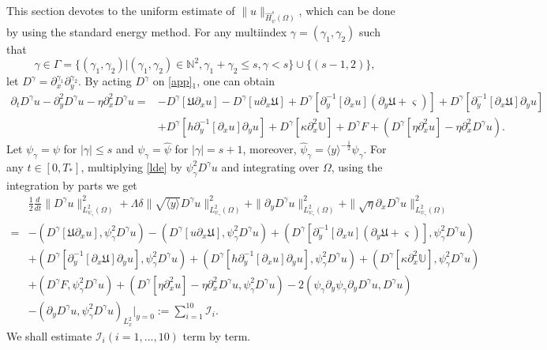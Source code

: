 \documentclass{amsart}
\numberwithin{equation}{section}
\newcommand\y{{{\langle y \rangle}}}
\begin{document}
This section devotes to the uniform estimate of $\|u\|_{\hat{H}_{\psi}^{s}(\Omega)}$, which can be done by using the standard energy method.
For any multiindex $\gamma=(\gamma_{1},\gamma_{2})$ such that
$$\gamma\in\Gamma=\{(\gamma_{1},\gamma_{2})|(\gamma_{1},\gamma_{2})\in\mathbb{N}^{2},\gamma_{1}+\gamma_{2}\leq s,\gamma<s\}\cup\{(s-1,2)\},$$
let $D^{\gamma}=\partial_{x}^{\gamma_{1}}\partial_{y}^{\gamma_{2}}$. By acting $D^{\gamma}$ on \eqref{app}$_{1}$, one can obtain
\begin{align}\label{lde}
\partial_{t}D^{\gamma}u
-\partial_{y}^{2}D^{\gamma}u
-\eta\partial_{x}^{2}D^{\gamma}u
=&-D^{\gamma}[\mathfrak{U}\partial_{x}u]
  -D^{\gamma}[u\partial_{x}\mathfrak{U}]
  +D^{\gamma}[\partial_{y}^{-1}[\partial_{x}u](\partial_{y}\mathfrak{U}+\varsigma)]
  +D^{\gamma}[\partial_{y}^{-1}[\partial_{x}\mathfrak{U}]\partial_{y}u]\\
 &+D^{\gamma}[h\partial_{y}^{-1}[\partial_{x}u]\partial_{y}u]
  +D^{\gamma}[\kappa\partial_{x}^{2}\mathbb{U}]
  +D^{\gamma}F
  +\left(D^{\gamma}[\eta\partial_{x}^{2}u]-\eta\partial_{x}^{2}D^{\gamma}u\right).\nonumber
\end{align}
Let $\psi_{\gamma}=\psi$ for $|\gamma|\leq s$ and $\psi_{\gamma}=\hat{\psi}$ for $|\gamma|=s+1$, moreover, $\hat{\psi}_{\gamma}=\y^{-\frac{1}{2}}\psi_{\gamma}$.
For any $t\in[0,T_{*}]$, multiplying \eqref{lde} by $\psi_{\gamma}^{2}D^{\gamma}u$ and integrating over $\Omega$, using the integration by parts we get
\begin{align}\label{le}
&\frac{1}{2}\frac{d}{dt}\|D^{\gamma}u \|_{L_{\psi_{\gamma}}^{2}(\Omega)}^{2}
+\Lambda\delta\|\sqrt{\y}D^{\gamma}u \|_{L_{\psi_{\gamma}}^{2}(\Omega)}^{2}
+\|\partial_{y}D^{\gamma}u\|_{L_{\psi_{\gamma}}^{2}(\Omega)}^{2}
+\|\sqrt{\eta}\partial_{x}D^{\gamma}u\|_{L_{\psi_{\gamma}}^{2}(\Omega)}^{2}\\
=&-(D^{\gamma}[\mathfrak{U}\partial_{x}u],\psi_{\gamma}^{2} D^{\gamma}u)
  -(D^{\gamma}[u\partial_{x}\mathfrak{U}],\psi_{\gamma}^{2} D^{\gamma}u)
  +(D^{\gamma}[\partial_{y}^{-1}[\partial_{x}u](\partial_{y}\mathfrak{U}+\varsigma)],\psi_{\gamma}^{2}D^{\gamma}u)\nonumber\\
 &+(D^{\gamma}[\partial_{y}^{-1}[\partial_{x}\mathfrak{U}]\partial_{y}u],\psi_{\gamma}^{2}D^{\gamma}u)
  +(D^{\gamma}[h\partial_{y}^{-1}[\partial_{x}u]\partial_{y}u],\psi_{\gamma}^{2}D^{\gamma}u)
  +(D^{\gamma}[\kappa\partial_{x}^{2}\mathbb{U}],\psi_{\gamma}^{2}D^{\gamma}u)\nonumber\\
 &+(D^{\gamma}F,\psi_{\gamma}^{2}D^{\gamma}u)
  +\left(D^{\gamma}[\eta\partial_{x}^{2}u]-\eta\partial_{x}^{2}D^{\gamma}u,\psi_{\gamma}^{2}D^{\gamma}u\right)
  -2(\psi_{\gamma}\partial_{y}\psi_{\gamma}\partial_{y}D^{\gamma}u,D^{\gamma}u)\nonumber\\
 &-(\partial_{y}D^{\gamma}u,\psi_{\gamma}^{2}D^{\gamma}u)_{L_{x}^{2}}|_{y=0}
:=\sum_{i=1}^{10}\mathcal{I}_{i}.\nonumber
\end{align}
We shall estimate $\mathcal{I}_{i}(i=1,...,10)$ term by term.
\end{document}
